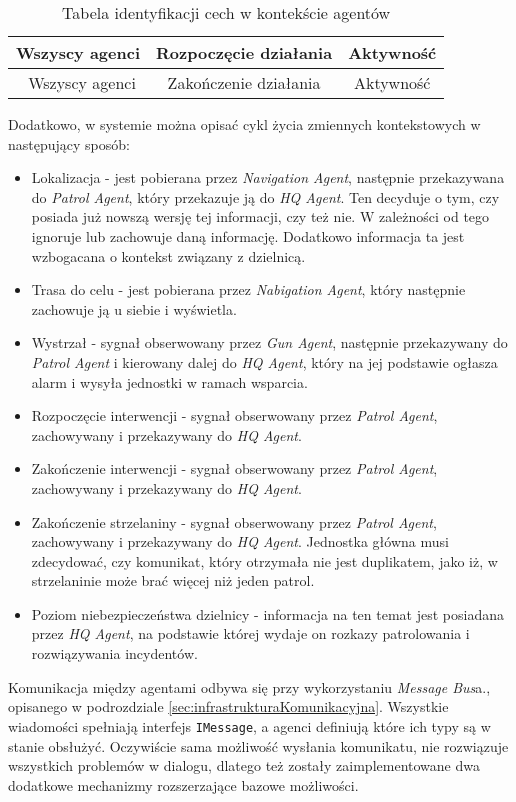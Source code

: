 \begin{table}[H]
\begin{tabular}{|c|c|c|}
     Wszyscy agenci & Rozpoczęcie działania & Aktywność \\ 
     \hline\
     Wszyscy agenci & Zakończenie działania & Aktywność \\ 
     \hline
    \end{tabular}
    \caption{Tabela identyfikacji cech w kontekście agentów}
    \label{tab:agentsFeaturesCategorization}
\end{table}

\par Dodatkowo, w systemie można opisać cykl życia zmiennych kontekstowych w następujący sposób:
\begin{itemize}
    \item Lokalizacja - jest pobierana przez \emph{Navigation Agent}, następnie przekazywana do \emph{Patrol Agent}, który przekazuje ją do \emph{HQ Agent}. Ten decyduje o tym, czy posiada już nowszą wersję tej informacji, czy też nie. W zależności od tego ignoruje lub zachowuje daną informację. Dodatkowo informacja ta jest wzbogacana o kontekst związany z dzielnicą.
    \item Trasa do celu - jest pobierana przez \emph{Nabigation Agent}, który następnie zachowuje ją u siebie i wyświetla.
    \item Wystrzał - sygnał obserwowany przez \emph{Gun Agent}, następnie przekazywany do \emph{Patrol Agent} i kierowany dalej do \emph{HQ Agent}, który na jej podstawie ogłasza alarm i wysyła jednostki w ramach wsparcia.
    \item Rozpoczęcie interwencji - sygnał obserwowany przez \emph{Patrol Agent}, zachowywany i przekazywany do \emph{HQ Agent}.
    \item Zakończenie interwencji - sygnał obserwowany przez \emph{Patrol Agent}, zachowywany i przekazywany do \emph{HQ Agent}.
    \item Zakończenie strzelaniny - sygnał obserwowany przez \emph{Patrol Agent}, zachowywany i przekazywany do \emph{HQ Agent}. Jednostka główna musi zdecydować, czy komunikat, który otrzymała nie jest duplikatem, jako iż, w strzelaninie może brać więcej niż jeden patrol.
    \item Poziom niebezpieczeństwa dzielnicy - informacja na ten temat jest posiadana przez \emph{HQ Agent}, na podstawie której wydaje on rozkazy patrolowania i rozwiązywania incydentów.
\end{itemize}

\par Komunikacja między agentami odbywa się przy wykorzystaniu \emph{Message Bus}a., opisanego w podrozdziale \ref{sec:infrastrukturaKomunikacyjna}. Wszystkie wiadomości spełniają interfejs \texttt{IMessage}, a agenci definiują które ich typy są w stanie obsłużyć. Oczywiście sama możliwość wysłania komunikatu, nie rozwiązuje wszystkich problemów w dialogu, dlatego też zostały zaimplementowane dwa dodatkowe mechanizmy rozszerzające bazowe możliwości.

